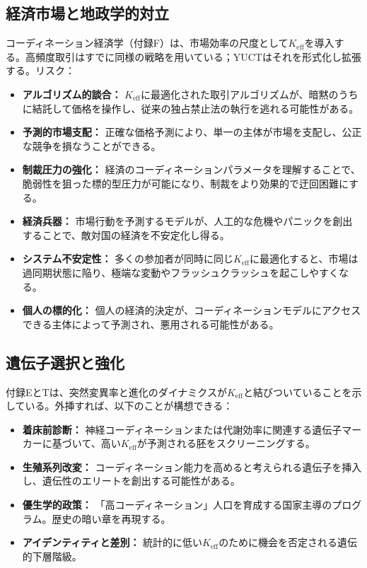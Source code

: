 \documentclass[12pt,a4paper]{article}
\theoremstyle{remark}
\newcommand{\Keff}{K_{\mathrm{eff}}}
\begin{document}
	\subsection{経済市場と地政学的対立}
	\label{subsec:econ}
	
	コーディネーション経済学（付録F）は、市場効率の尺度として\(\Keff\)を導入する。高頻度取引はすでに同様の戦略を用いている；YUCTはそれを形式化し拡張する。リスク：
	\begin{itemize}[leftmargin=*]
		\item \textbf{アルゴリズム的談合：} \(\Keff\)に最適化された取引アルゴリズムが、暗黙のうちに結託して価格を操作し、従来の独占禁止法の執行を逃れる可能性がある。
		\item \textbf{予測的市場支配：} 正確な価格予測により、単一の主体が市場を支配し、公正な競争を損なうことができる。
		\item \textbf{制裁圧力の強化：} 経済のコーディネーションパラメータを理解することで、脆弱性を狙った標的型圧力が可能になり、制裁をより効果的で迂回困難にする。
		\item \textbf{経済兵器：} 市場行動を予測するモデルが、人工的な危機やパニックを創出することで、敵対国の経済を不安定化し得る。
		\item \textbf{システム不安定性：} 多くの参加者が同時に同じ\(\Keff\)に最適化すると、市場は過同期状態に陥り、極端な変動やフラッシュクラッシュを起こしやすくなる。
		\item \textbf{個人の標的化：} 個人の経済的決定が、コーディネーションモデルにアクセスできる主体によって予測され、悪用される可能性がある。
	\end{itemize}
	
	\subsection{遺伝子選択と強化}
	\label{subsec:genetic}
	
	付録EとTは、突然変異率と進化のダイナミクスが\(\Keff\)と結びついていることを示している。外挿すれば、以下のことが構想できる：
	\begin{itemize}[leftmargin=*]
		\item \textbf{着床前診断：} 神経コーディネーションまたは代謝効率に関連する遺伝子マーカーに基づいて、高い\(\Keff\)が予測される胚をスクリーニングする。
		\item \textbf{生殖系列改変：} コーディネーション能力を高めると考えられる遺伝子を挿入し、遺伝性のエリートを創出する可能性がある。
		\item \textbf{優生学的政策：} 「高コーディネーション」人口を育成する国家主導のプログラム。歴史の暗い章を再現する。
		\item \textbf{アイデンティティと差別：} 統計的に低い\(\Keff\)のために機会を否定される遺伝的下層階級。
	\end{itemize}
	
\end{document}
